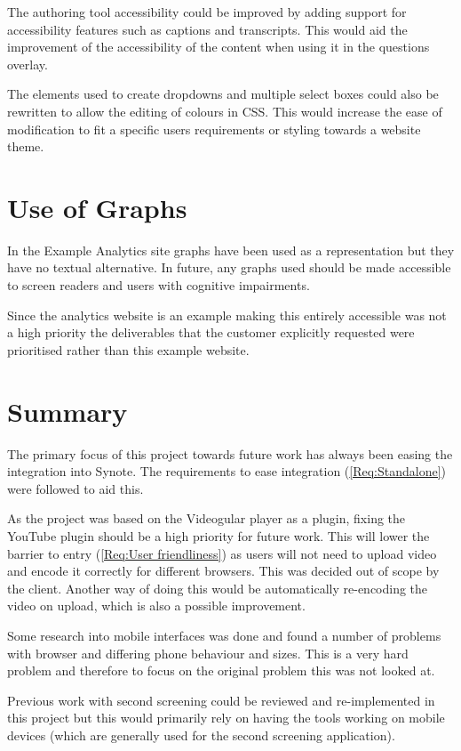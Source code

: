 The authoring tool accessibility could be improved by adding support for accessibility features such as captions and transcripts. This would aid the improvement of the accessibility of the content when using it in the questions overlay.

The elements used to create dropdowns and multiple select boxes could also be rewritten to allow the editing of colours in \gls{CSS}. This would increase the ease of modification to fit a specific users requirements or styling towards a website theme.

\section{Use of Graphs}

In the Example Analytics site graphs have been used as a representation but they have no textual alternative. In future, any graphs used should be made accessible to screen readers and users with cognitive impairments.

Since the analytics website is an example making this entirely accessible was not a high priority the deliverables that the customer explicitly requested were prioritised rather than this example website.

\section{Summary}

The primary focus of this project towards future work has always been easing the integration into Synote. The requirements to ease integration (\cref{Req:Standalone}) were followed to aid this.

As the project was based on the Videogular player as a plugin, fixing the YouTube plugin should be a high priority for future work. This will lower the barrier to entry (\cref{Req:User friendliness}) as users will not need to upload video and encode it correctly for different browsers. This was decided out of scope by the client. Another way of doing this would be automatically re-encoding the video on upload, which is also a possible improvement.

Some research into mobile interfaces was done and found a number of problems with browser and differing phone behaviour and sizes. This is a very hard problem and therefore to focus on the original problem this was not looked at.

Previous work with second screening could be reviewed and re-implemented in this project but this would primarily rely on having the tools working on mobile devices (which are generally used for the second screening application).

